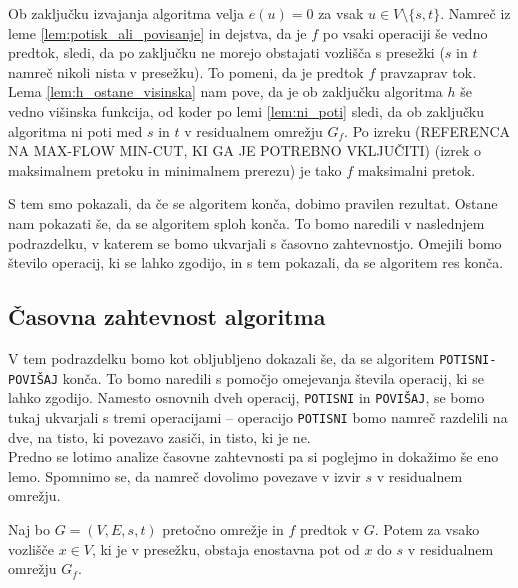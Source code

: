 \documentclass[mat1]{fmfdelo}
\begin{document}
\begin{dokaz}
Ob zaključku izvajanja algoritma velja $e(u) = 0$ za vsak $u \in V\setminus \{s,t\}$. Namreč iz leme \ref{lem:potisk_ali_povisanje} in dejstva, da je $f$ po vsaki operaciji še vedno predtok, sledi, da po zaključku ne morejo obstajati vozlišča s presežki ($s$ in $t$ namreč nikoli nista v presežku). To pomeni, da je predtok $f$ pravzaprav tok. Lema \ref{lem:h_ostane_visinska} nam pove, da je ob zaključku algoritma $h$ še vedno višinska funkcija, od koder po lemi \ref{lem:ni_poti} sledi, da ob zaključku algoritma ni poti med $s$ in $t$ v residualnem omrežju $G_f$. Po izreku (REFERENCA NA MAX-FLOW MIN-CUT, KI GA JE POTREBNO VKLJUČITI) (izrek o maksimalnem pretoku in minimalnem prerezu) je tako $f$ maksimalni pretok.
\end{dokaz}

S tem smo pokazali, da če se algoritem konča, dobimo pravilen rezultat. Ostane nam pokazati še, da se algoritem sploh konča. To bomo naredili v naslednjem podrazdelku, v katerem se bomo ukvarjali s časovno zahtevnostjo. Omejili bomo število operacij, ki se lahko zgodijo, in s tem pokazali, da se algoritem res konča.\\

\subsection{Časovna zahtevnost algoritma}

V tem podrazdelku bomo kot obljubljeno dokazali še, da se algoritem \texttt{POTISNI-POVIŠAJ} konča. To bomo naredili s pomočjo omejevanja števila operacij, ki se lahko zgodijo. Namesto osnovnih dveh operacij, \texttt{POTISNI} in \texttt{POVIŠAJ}, se bomo tukaj ukvarjali s tremi operacijami -- operacijo \texttt{POTISNI} bomo namreč razdelili na dve, na tisto, ki povezavo zasiči, in tisto, ki je ne.\\

Predno se lotimo analize časovne zahtevnosti pa si poglejmo in dokažimo še eno lemo. Spomnimo se, da namreč dovolimo povezave v izvir $s$ v residualnem omrežju.\\

\begin{lema}\label{lem:enostavna_pot_s}
Naj bo $G=(V,E,s,t)$ pretočno omrežje in $f$ predtok v $G$. Potem za vsako vozlišče $x\in V$, ki je v presežku, obstaja enostavna pot od $x$ do $s$ v residualnem omrežju $G_f$.
\end{lema}
\end{document}
